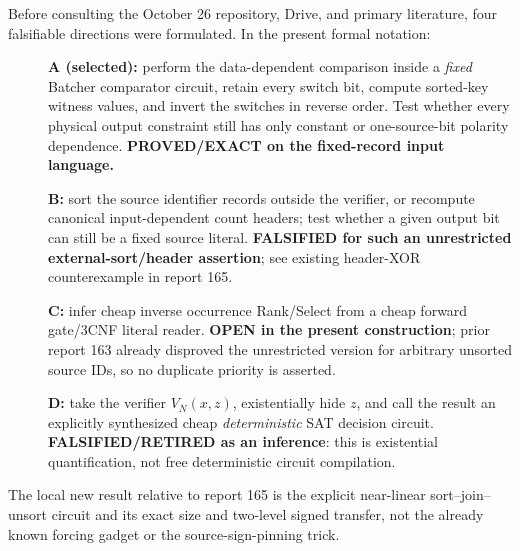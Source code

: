 \documentclass[11pt]{article}
\begin{document}
Before consulting the October 26 repository, Drive, and primary literature,
four falsifiable directions were formulated. In the present formal notation:
\begin{description}
\item[] \textbf{A (selected):} perform the data-dependent comparison inside a
\emph{fixed} Batcher comparator circuit, retain every switch bit, compute
sorted-key witness values, and invert the switches in reverse order. Test
whether every physical output constraint still has only constant or one-source-bit
polarity dependence. \textbf{PROVED/EXACT on the fixed-record input language.}
\item[] \textbf{B:} sort the source identifier records outside the verifier, or
recompute canonical input-dependent count headers; test whether a given
output bit can still be a fixed source literal. \textbf{FALSIFIED for such
an unrestricted external-sort/header assertion}; see existing header-XOR
counterexample in report 165.
\item[] \textbf{C:} infer cheap inverse occurrence Rank/Select from a cheap
forward gate/3CNF literal reader. \textbf{OPEN in the present construction};
prior report 163 already disproved the unrestricted version for arbitrary
unsorted source IDs, so no duplicate priority is asserted.
\item[] \textbf{D:} take the verifier $V_N(x,z)$, existentially hide $z$, and
call the result an explicitly synthesized cheap \emph{deterministic} SAT
decision circuit. \textbf{FALSIFIED/RETIRED as an inference}: this is
existential quantification, not free deterministic circuit compilation.
\end{description}
The local new result relative to report 165 is the explicit near-linear
sort--join--unsort circuit and its exact size and two-level signed transfer,
not the already known forcing gadget or the source-sign-pinning trick.
\end{document}
